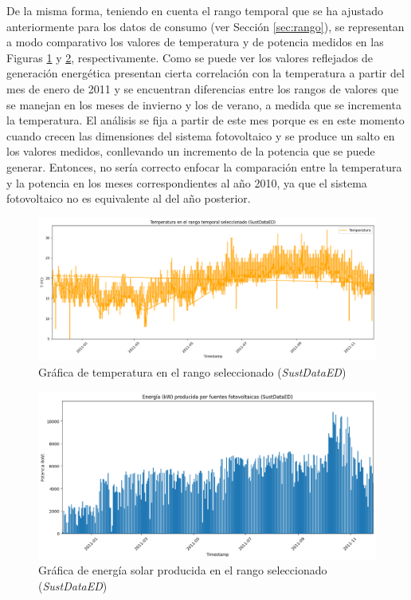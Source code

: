 \vspace{3mm}

De la misma forma, teniendo en cuenta el rango temporal que se ha ajustado anteriormente para los datos de consumo (ver Sección \ref{sec:rango}), se representan a modo comparativo los valores de temperatura y de potencia medidos en las Figuras \ref{fig:temp} y \ref{fig:solaryear}, respectivamente. Como se puede ver los valores reflejados de generación energética presentan cierta correlación con la temperatura a partir del mes de enero de 2011 y se encuentran diferencias entre los rangos de valores que se manejan en los meses de invierno y los de verano, a medida que se incrementa la temperatura. El análisis se fija a partir de este mes porque es en este momento cuando crecen las dimensiones del sistema fotovoltaico y se produce un salto en los valores medidos, conllevando un incremento de la potencia que se puede generar. Entonces, no sería correcto enfocar la comparación entre la temperatura y la potencia en los meses correspondientes al año 2010, ya que el sistema fotovoltaico no es equivalente al del año posterior.

\vspace{3mm}

\begin{figure}[H]
  \centering
  \includegraphics[width=1\textwidth]{img/diseno/temp.png}
  \caption{Gráfica de temperatura en el rango seleccionado (\textit{SustDataED})}
  \label{fig:temp}
\end{figure}

\begin{figure}[H]
  \centering
  \includegraphics[width=1\textwidth]{img/diseno/matplotsolaryear.png}
  \caption{Gráfica de energía solar producida en el rango seleccionado (\textit{SustDataED})}
  \label{fig:solaryear}
\end{figure}

